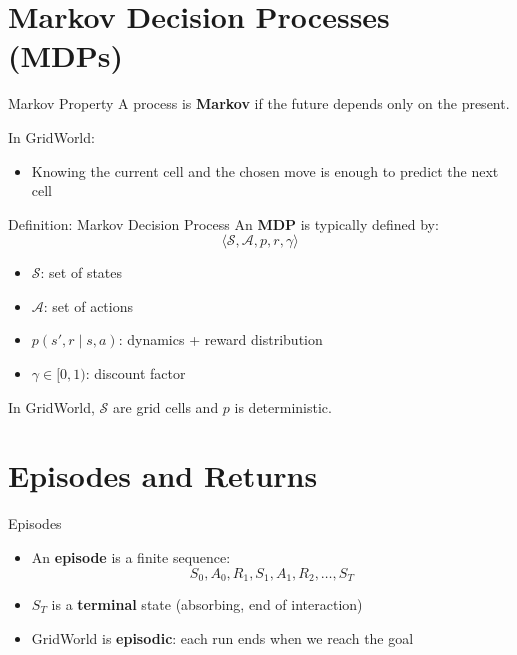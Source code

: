 \documentclass[11pt]{beamer}
\begin{document}
\section{Markov Decision Processes (MDPs)}

\begin{frame}{Markov Property}
A process is \textbf{Markov} if the future depends only on the present.


\vspace{6pt}
In GridWorld:
\begin{itemize}
  \item Knowing the current cell and the chosen move is enough to predict the next cell
\end{itemize}

\end{frame}

\begin{frame}{Definition: Markov Decision Process}
An \textbf{MDP} is typically defined by:
\[
\langle \mathcal{S}, \mathcal{A}, p, r, \gamma \rangle
\]
\begin{itemize}
  \item $\mathcal{S}$: set of states
  \item $\mathcal{A}$: set of actions
  \item $p(s',r\mid s,a)$: dynamics + reward distribution
  \item $\gamma \in [0,1)$: discount factor
\end{itemize}

\vspace{6pt}
In GridWorld, $\mathcal{S}$ are grid cells and $p$ is deterministic.
\end{frame}

\section{Episodes and Returns}

\begin{frame}{Episodes}
\begin{itemize}
  \item An \textbf{episode} is a finite sequence:
  \[
  S_0, A_0, R_1, S_1, A_1, R_2, \dots, S_T
  \]
  \item $S_T$ is a \textbf{terminal} state (absorbing, end of interaction)
  \item GridWorld is \textbf{episodic}: each run ends when we reach the goal
\end{itemize}

\end{frame}
\end{document}
